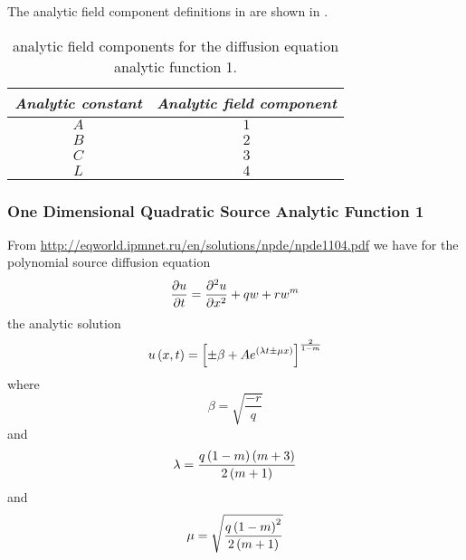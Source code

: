 The analytic field component definitions in \OpenCMISS are shown in .

\begin{table}[htb] \centering
  \begin{tabular}{|c|c|} \hline
    \emph{Analytic constant} & \emph{Analytic field component} \\ \hline \hline
    $A$ & $1$ \\ 
    $B$ & $2$ \\
    $C$ & $3$ \\
    $L$ & $4$ \\ \hline
  \end{tabular}
  \caption{\OpenCMISS analytic field components for the \oned diffusion equation
    analytic function 1.}
  \label{tab:OpenCMISSAnalyticFieldDiffusionEquationOneDim1}
\end{table}

\subsubsection{One Dimensional Quadratic Source Analytic Function 1}

From \url{http://eqworld.ipmnet.ru/en/solutions/npde/npde1104.pdf} we have for
the \oned polynomial source diffusion equation
\begin{equation}
   \dfrac{\partial u}{\partial t} = \dfrac{\partial^{2} u}{\partial {x}^{2}} +qw+rw^{m}
\end{equation}
the analytic solution
\begin{equation}
   u\left( x,t \right) =\left[ \pm\beta+Ae^{\left( \lambda t \pm\mu x \right)} \right]^\frac{2}{1-m}
\end{equation}
where
\begin{equation}
  \beta=\sqrt{\dfrac{-r}{q}}
\end{equation}
and
\begin{equation}
  \lambda=\dfrac{q\left( 1-m \right)\left( m+3 \right)}{2\left( m+1 \right)}
\end{equation}
and 
\begin{equation}
  \mu=\sqrt{\dfrac{q\left( 1-m \right)^{2}}{2\left( m+1 \right)}}
\end{equation}

